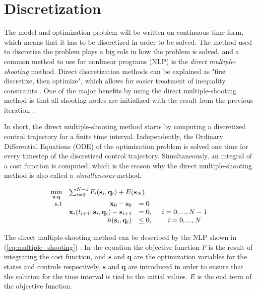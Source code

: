\section{Discretization}

The model and optimization problem will be written on continuous time form, which means that it has to be discretized in order to be solved. The method used to discretize the problem plays a big role in how the problem is solved, and a common method to use for nonlinear programs (NLP) is the \textit{direct multiple-shooting} method. Direct discretization methods can be explained as "first discretize, then optimize", which allows for easier treatment of inequality constraints \cite{discDIEHL}. One of the major benefits by using the direct multiple-shooting method is that all shooting nodes are initialized with the result from the previous iteration \cite{stallMATHISEN}.

In short, the direct multiple-shooting method starts by computing a discretized control trajectory for a finite time interval. Independently, the Ordinary Differential Equations (ODE) of the optimization problem is solved one time for every timestep of the discretized control trajectory. Simultaneously, an integral of a cost function is computed, which is the reason why the direct multiple-shooting method is also called a \textit{simultaneous} method. 

\begin{equation}
\label{eq:multiple_shooting}
	\begin{array}{rrlcl}
	\displaystyle \min_{\mathbf{s},\mathbf{q}} & \multicolumn{3}{l}{\sum_{i=0}^{N-1} F_i(\mathbf{s}_i, \mathbf{q}_i)+ E(\mathbf{s}_N)} \\
	\textrm{s.t}
	& \mathbf{x}_0 - \mathbf{s}_0 & = 0 & \\
	& \mathbf{x}_i(t_{i+1};\mathbf{s}_i,\mathbf{q}_i)-\mathbf{s}_{i+1} & = 0,& \hspace{5pt} i = 0,...,N-1 \\
	& h(\mathbf{s}_i, \mathbf{q}_i) & \leq 0,& \hspace{5pt} i = 0,...,N
	\end{array}
\end{equation}

The direct multiple-shooting method can be described by the NLP shown in (\ref{eq:multiple_shooting}) \cite{stallMATHISEN}. In the equation the objective function $F$ is the result of integrating the cost function, and $\mathbf{s}$ and $\mathbf{q}$ are the optimization variables for the states and controls respectively. $\mathbf{s}$ and $\mathbf{q}$ are introduced in order to ensure that the solution for the time interval is tied to the initial values. $E$ is the end term of the objective function.